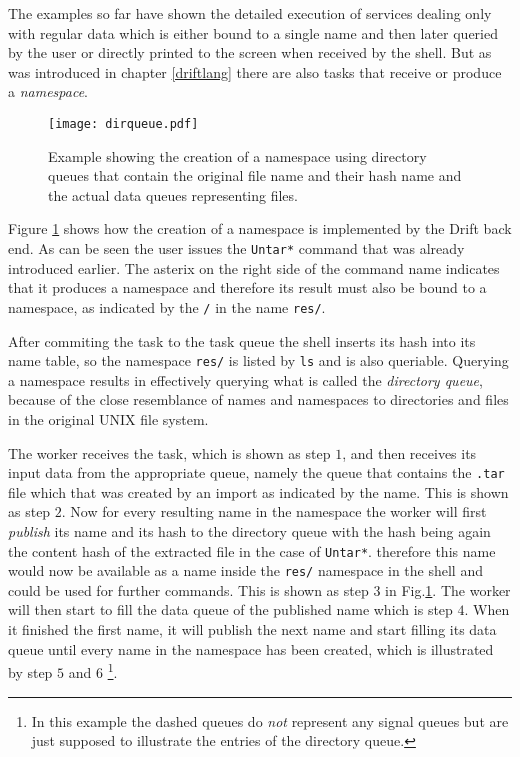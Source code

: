 The examples so far have shown the detailed execution of services
dealing only with regular data which is either bound to
a single name and then later queried by the user or directly
printed to the screen when received by the shell. But as was
introduced in chapter \ref{driftlang} there are also tasks that
receive or produce a \textit{namespace}.

\begin{figure}[h]
  \texttt{[image: dirqueue.pdf]}
  \caption{Example showing the creation of a namespace using
           directory queues that contain the original file name
           and their hash name and the actual data queues representing
           files.}
  \label{dirqueue}
\end{figure}

Figure \ref{dirqueue} shows how the creation of a namespace
is implemented by the Drift back end. As can be seen the user
issues the \texttt{Untar*} command that was already introduced
earlier. The asterix on the right side of the command name
indicates that it produces a namespace and therefore
its result must also be bound to a namespace, as indicated by
the \texttt{/} in the name \texttt{res/}.

After commiting the task to the task queue the shell inserts
its hash into its name table, so the namespace \texttt{res/}
is listed by \texttt{ls} and is also queriable. Querying a
namespace results in effectively querying what is called the
\textit{directory queue}, because of the close resemblance of
names and namespaces to directories and files in the original
UNIX file system.

The worker receives the task, which is shown as step $1$,
and then receives its input data from the appropriate queue,
namely the queue that contains the \texttt{.tar} file which
that was created by an import as indicated by the name. This
is shown as step $2$.
Now for every resulting name in the namespace the worker will
first \textit{publish} its name and its hash to the directory
queue with the hash being again the content hash of the extracted
file in the case of \texttt{Untar*}. therefore this name would
now be available as a name inside the \texttt{res/} namespace
in the shell and could be used for further commands. This is shown
as step $3$ in Fig.\ref{dirqueue}. The worker
will then start to fill the data queue of the published name which
is step $4$.
When it finished the first name, it will publish the next name
and start filling its data queue until every name in the namespace
has been created, which is illustrated by step $5$ and $6$
\footnote{In this example the dashed queues do \textit{not} represent any
signal queues but are just supposed to illustrate the entries
of the directory queue.}.

